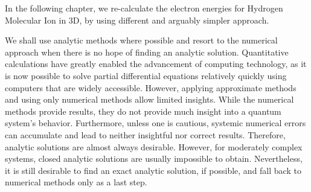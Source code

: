 In the following chapter, we re-calculate the electron energies for Hydrogen Molecular Ion in 3D, by using different and arguably simpler approach.

We shall use analytic methods where possible and resort to the numerical approach when there is no hope of finding an analytic solution.
Quantitative calculations have greatly enabled the advancement of computing technology, as it is now possible to solve partial differential equations relatively quickly using computers that are widely accessible.  However, applying approximate methods and using only numerical methods allow limited insights. While the numerical methods provide results, they do not provide much insight into a quantum system's behavior. Furthermore, unless one is cautious, systemic numerical errors can accumulate and lead to neither insightful nor correct results. Therefore, analytic solutions are almost always desirable. However, for moderately complex systems, closed analytic solutions are usually impossible to obtain. Nevertheless, it is still desirable to find an exact analytic solution,  if possible, and fall back to numerical methods only as a last step. 